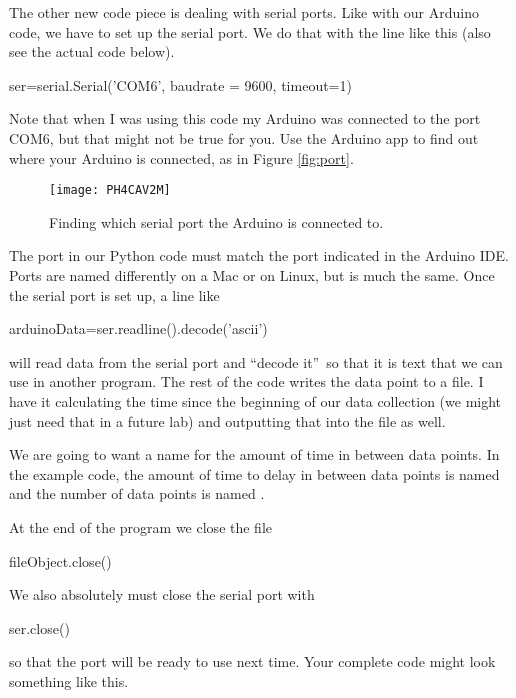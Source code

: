 The other new code piece is dealing with serial ports. Like with our Arduino
code, we have to set up the serial port. We do that with the line like
this (also see the actual code below).
\begin{python}
	ser=serial.Serial('COM6', baudrate = 9600, timeout=1)
\end{python}
Note that when I was using this code my Arduino was connected to 
the port COM6, but that might
not be true for you. Use the Arduino app to find out where your Arduino is
connected, as in Figure \ref{fig:port}.
\begin{figure}[htbp!]
    \centering
\texttt{[image: PH4CAV2M]}
    \caption[Finding which serial port the Arduino is connected to]
    {Finding which serial port the Arduino is connected to.}
\end{figure}

The port in our Python code must match the port indicated in the Arduino IDE. 
Ports are named differently on a Mac or on Linux, but is
much the same. Once the serial port is set up, a line like
\begin{python}
	arduinoData=ser.readline().decode('ascii')
\end{python}
will read data from the serial port and \textquotedblleft decode
it\textquotedblright\ so that it is text that we can use in another program.
The rest of the code writes the data point to a file. I have it calculating
the time since the beginning of our data collection (we might just need that
in a future lab) and outputting that into the file as well.

We are going to want a name for the amount of time in between data points.
In the example code, the amount of time to delay in between data points is
named  and the number of data points is named .

At the end of the program we close the file
\begin{python}
	fileObject.close()
\end{python}
We also absolutely must close the serial port with
\begin{python}
	ser.close()
\end{python}
so that the port will be ready to use next time. Your complete code might look
something like this.


